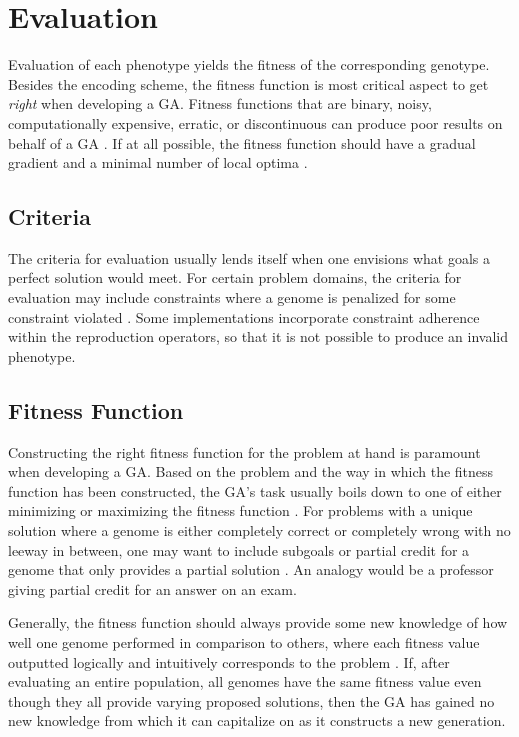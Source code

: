 \section{Evaluation}

Evaluation of each phenotype yields the fitness of the corresponding genotype. Besides the encoding scheme, the fitness function is most critical aspect to get \textit{right} when developing a GA. Fitness functions that are binary, noisy, computationally expensive, erratic, or discontinuous can produce poor results on behalf of a GA \cite{Beasley93anoverview}. If at all possible, the fitness function should have a gradual gradient and a minimal number of local optima \cite{Beasley93anoverview}.     

\subsection{Criteria}

The criteria for evaluation usually lends itself when one envisions what goals a perfect solution would meet. For certain problem domains, the criteria for evaluation may include constraints where a genome is penalized for some constraint violated \cite{Beasley93anoverview}. Some implementations incorporate constraint adherence within the reproduction operators, so that it is not possible to produce an invalid phenotype.

\subsection{Fitness Function}

Constructing the right fitness function for the problem at hand is paramount when developing a GA. Based on the problem and the way in which the fitness function has been constructed, the GA's task usually boils down to one of either minimizing or maximizing the fitness function \cite{ColinReeves}. For problems with a unique solution where a genome is either completely correct or completely wrong with no leeway in between, one may want to include subgoals or partial credit for a genome that only provides a partial solution \cite{Beasley93anoverview}. An analogy would be a professor giving partial credit for an answer on an exam. 

Generally, the fitness function should always provide some new knowledge of how well one genome performed in comparison to others, where each fitness value outputted logically and intuitively corresponds to the problem \cite{Beasley93anoverview}. If, after evaluating an entire population, all genomes have the same fitness value even though they all provide varying proposed solutions, then the GA has gained no new knowledge from which it can capitalize on as it constructs a new generation.      

